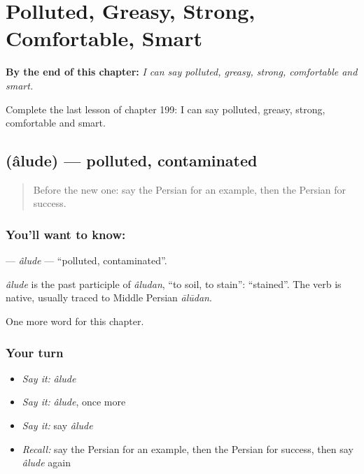 
\chapter{Polluted, Greasy, Strong, Comfortable, Smart}
\label{ch:fa-polluted-greasy-strong-comfortable-smart}

\begin{chapteropening}
\textbf{By the end of this chapter:} \emph{I can say polluted, greasy, strong, comfortable and smart.}

Complete the last lesson of chapter 199: I can say polluted, greasy, strong, comfortable and smart.
\end{chapteropening}

\section[\texorpdfstring{\fa{آلوده} (âlude)}{آلوده (âlude)}]{ (âlude) — polluted, contaminated}

\label{lesson:FA-C199-alude}



\begin{quote}
Before the new one: say the Persian for an example, then the Persian for success.
\end{quote}

\subsection*{You'll want to know: }
\textbf{} — \emph{âlude} — \textquotedblleft{}polluted, contaminated\textquotedblright{}.

\begin{cousinweb}
\emph{âlude} is the past participle of \emph{âludan}, \textquotedblleft{}to soil, to stain\textquotedblright{}: \textquotedblleft{}stained\textquotedblright{}. The verb is native, usually traced to Middle Persian \emph{ālūdan}.
\end{cousinweb}

\begin{grammarlens}[title={What you've built}]
One more word for this chapter.
\end{grammarlens}

\subsection*{Your turn}
\begin{itemize}
\raggedright
  \item \emph{Say it:} \emph{âlude}
  \item \emph{Say it:} \emph{âlude}, once more
  \item \emph{Say it:} say \emph{âlude}
  \item \emph{Recall:} say the Persian for an example, then the Persian for success, then say \emph{âlude} again
\end{itemize}

